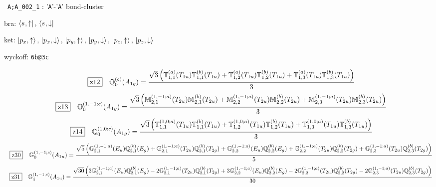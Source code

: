 \documentclass[fleqn,10pt,landscape]{jsarticle}
\begin{document}
\noindent\textbullet\, \texttt{A;A_002_1} : '\texttt{A}'-'\texttt{A}' bond-cluster

\noindent\quad * bra: $\bra{s_{},\uparrow},\, \bra{s_{},\downarrow}$

\noindent\quad * ket: $\ket{p_{x},\uparrow},\, \ket{p_{x},\downarrow},\, \ket{p_{y},\uparrow},\, \ket{p_{y},\downarrow},\, \ket{p_{z},\uparrow},\, \ket{p_{z},\downarrow}$

\noindent\quad * wyckoff: \texttt{6b@3c}

\begin{dmath*}
\hspace*{3mm}\fbox{z12}\quad \mathbb{Q}_{0}^{(c)}(A_{1g})=\frac{\sqrt{3} \left(\mathbb{T}_{1,1}^{(a)}(T_{1u}) \mathbb{T}_{1,1}^{(b)}(T_{1u}) + \mathbb{T}_{1,2}^{(a)}(T_{1u}) \mathbb{T}_{1,2}^{(b)}(T_{1u}) + \mathbb{T}_{1,3}^{(a)}(T_{1u}) \mathbb{T}_{1,3}^{(b)}(T_{1u})\right)}{3}
\end{dmath*}
\begin{dmath*}
\hspace*{3mm}\fbox{z13}\quad \mathbb{Q}_{0}^{(1,-1;c)}(A_{1g})=\frac{\sqrt{3} \left(\mathbb{M}_{2,1}^{(1,-1;a)}(T_{2u}) \mathbb{M}_{2,1}^{(b)}(T_{2u}) + \mathbb{M}_{2,2}^{(1,-1;a)}(T_{2u}) \mathbb{M}_{2,2}^{(b)}(T_{2u}) + \mathbb{M}_{2,3}^{(1,-1;a)}(T_{2u}) \mathbb{M}_{2,3}^{(b)}(T_{2u})\right)}{3}
\end{dmath*}
\begin{dmath*}
\hspace*{3mm}\fbox{z14}\quad \mathbb{Q}_{0}^{(1,0;c)}(A_{1g})=\frac{\sqrt{3} \left(\mathbb{T}_{1,1}^{(1,0;a)}(T_{1u}) \mathbb{T}_{1,1}^{(b)}(T_{1u}) + \mathbb{T}_{1,2}^{(1,0;a)}(T_{1u}) \mathbb{T}_{1,2}^{(b)}(T_{1u}) + \mathbb{T}_{1,3}^{(1,0;a)}(T_{1u}) \mathbb{T}_{1,3}^{(b)}(T_{1u})\right)}{3}
\end{dmath*}
\begin{dmath*}
\hspace*{3mm}\fbox{z30}\quad \mathbb{G}_{0}^{(1,-1;c)}(A_{1u})=\frac{\sqrt{5} \left(\mathbb{G}_{2,1}^{(1,-1;a)}(E_{u}) \mathbb{Q}_{2,1}^{(b)}(E_{g}) + \mathbb{G}_{2,1}^{(1,-1;a)}(T_{2u}) \mathbb{Q}_{2,1}^{(b)}(T_{2g}) + \mathbb{G}_{2,2}^{(1,-1;a)}(E_{u}) \mathbb{Q}_{2,2}^{(b)}(E_{g}) + \mathbb{G}_{2,2}^{(1,-1;a)}(T_{2u}) \mathbb{Q}_{2,2}^{(b)}(T_{2g}) + \mathbb{G}_{2,3}^{(1,-1;a)}(T_{2u}) \mathbb{Q}_{2,3}^{(b)}(T_{2g})\right)}{5}
\end{dmath*}
\begin{dmath*}
\hspace*{3mm}\fbox{z31}\quad \mathbb{G}_{4}^{(1,-1;c)}(A_{1u})=\frac{\sqrt{30} \left(3 \mathbb{G}_{2,1}^{(1,-1;a)}(E_{u}) \mathbb{Q}_{2,1}^{(b)}(E_{g}) - 2 \mathbb{G}_{2,1}^{(1,-1;a)}(T_{2u}) \mathbb{Q}_{2,1}^{(b)}(T_{2g}) + 3 \mathbb{G}_{2,2}^{(1,-1;a)}(E_{u}) \mathbb{Q}_{2,2}^{(b)}(E_{g}) - 2 \mathbb{G}_{2,2}^{(1,-1;a)}(T_{2u}) \mathbb{Q}_{2,2}^{(b)}(T_{2g}) - 2 \mathbb{G}_{2,3}^{(1,-1;a)}(T_{2u}) \mathbb{Q}_{2,3}^{(b)}(T_{2g})\right)}{30}
\end{dmath*}
\end{document}
